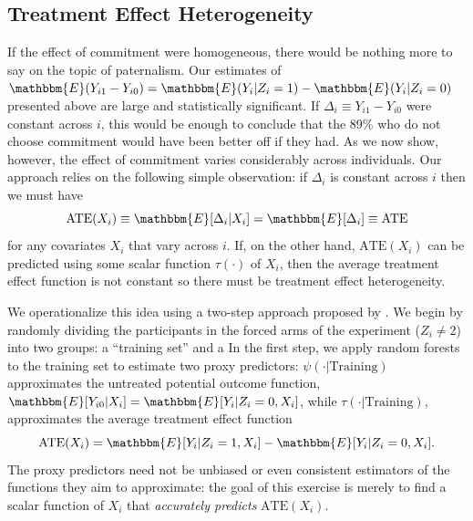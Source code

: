 \documentclass[oneside,11pt]{article}
\begin{document}


\subsection{Treatment Effect Heterogeneity}

If the effect of commitment were homogeneous, there would be nothing more to say on the topic of paternalism. Our estimates of $\mathbbm{E}(Y_{i1} - Y_{i0}) = \mathbbm{E}(Y_i|Z_i=1) - \mathbbm{E}(Y_i|Z_i=0)$ presented above are large and statistically significant. If $\Delta_i \equiv Y_{i1} - Y_{i0}$ were constant across $i$, this would be enough to conclude that the 89\% who do not choose commitment would have been better off if they had. As we now show, however, the effect of commitment varies considerably across individuals. Our approach relies on the following simple observation: if $\Delta_i$ is constant across $i$ then we must have 
\[
\text{ATE}(X_i) \equiv \mathbbm{E}[\Delta_i |X_i] = \mathbbm{E}[\Delta_i] \equiv \text{ATE}
\]
for any covariates $X_i$ that vary across $i$. If, on the other hand, $\text{ATE}(X_i)$ can be predicted using some scalar function $\tau(\cdot)$ of $X_i$, then the average treatment effect function is not constant so there must be treatment effect heterogeneity. 

We operationalize this idea using a two-step approach proposed by \cite{chernozhukov2018generic}.  We begin by randomly dividing the participants in the forced arms of the experiment ($Z_i \neq 2$) into two groups: a ``training set'' and a  In the first step, we apply random forests to the training set to estimate two proxy predictors: $\psi(\cdot|\text{Training})$ approximates the untreated potential outcome function, $\mathbbm{E}[Y_{i0}|X_i] = \mathbbm{E}[Y_i|Z_i=0,X_i]$, while  $\tau(\cdot|\text{Training})$, approximates the average treatment effect function
\[
\text{ATE}(X_i) = \mathbbm{E}[Y_i|Z_i=1,X_i] - \mathbbm{E}[Y_i|Z_i=0, X_i].
\]
The proxy predictors need not be unbiased or even consistent estimators of the functions they aim to approximate: the goal of this exercise is merely to find a scalar function of $X_i$ that \emph{accurately predicts} $\text{ATE}(X_i)$.
\end{document}
